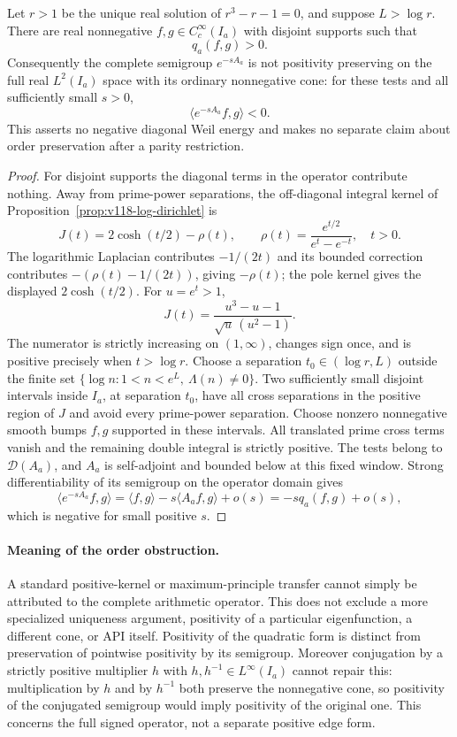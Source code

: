 \begin{proposition}
\label{prop:ns55-nonpositive-semigroup}
Let $r>1$ be the unique real solution of $r^3-r-1=0$, and suppose
$L>\log r$. There are real nonnegative
$f,g\in C_c^\infty(I_a)$ with disjoint supports such that
\begin{equation}\label{eq:ns55-positive-cross}
 q_a(f,g)>0.
\end{equation}
Consequently the complete semigroup $e^{-sA_a}$ is not positivity
preserving on the full real $L^2(I_a)$ space with its ordinary
nonnegative cone: for these tests and all sufficiently small $s>0$,
\[
 \langle e^{-sA_a}f,g\rangle<0.
\]
This asserts no negative diagonal Weil energy and makes no separate
claim about order preservation after a parity restriction.
\end{proposition}
\begin{proof}
For disjoint supports the diagonal terms in the operator contribute
nothing. Away from prime-power separations, the off-diagonal integral
kernel of Proposition~\ref{prop:v118-log-dirichlet} is
\[
 J(t)=2\cosh(t/2)-\rho(t),\qquad
 \rho(t)=\frac{e^{t/2}}{e^t-e^{-t}},\quad t>0.
\]
The logarithmic Laplacian contributes $-1/(2t)$ and its bounded
correction contributes $-(\rho(t)-1/(2t))$, giving $-\rho(t)$;
the pole kernel gives the displayed $2\cosh(t/2)$.
For $u=e^t>1$,
\[
 J(t)=\frac{u^3-u-1}{\sqrt u\,(u^2-1)}.
\]
The numerator is strictly increasing on $(1,\infty)$, changes sign
once, and is positive precisely when $t>\log r$.
Choose a separation $t_0\in(\log r,L)$ outside the finite set
$\{\log n:1<n<e^L,\ \Lambda(n)\ne0\}$. Two sufficiently small
disjoint intervals inside $I_a$, at separation $t_0$, have all
cross separations in the positive region of $J$ and avoid every
prime-power separation. Choose nonzero nonnegative smooth bumps
$f,g$ supported in these intervals. All translated prime cross
terms vanish and the remaining double integral is strictly positive.
The tests belong to $\mathcal D(A_a)$, and $A_a$ is self-adjoint
and bounded below at this fixed window. Strong differentiability
of its semigroup on the operator domain gives
\[
 \langle e^{-sA_a}f,g\rangle
 =\langle f,g\rangle-s\langle A_af,g\rangle+o(s)
 =-s q_a(f,g)+o(s),
\]
which is negative for small positive $s$.
\end{proof}

\paragraph{Meaning of the order obstruction.}
A standard positive-kernel or maximum-principle transfer cannot simply
be attributed to the complete arithmetic operator. This does not
exclude a more specialized uniqueness argument, positivity of a
particular eigenfunction, a different cone, or API itself.
Positivity of the quadratic form is distinct from preservation of
pointwise positivity by its semigroup. Moreover conjugation by a
strictly positive multiplier $h$ with $h,h^{-1}\in L^\infty(I_a)$
cannot repair this: multiplication by $h$ and by $h^{-1}$ both
preserve the nonnegative cone, so positivity of the conjugated
semigroup would imply positivity of the original one. This concerns
the full signed operator, not a separate positive edge form.


